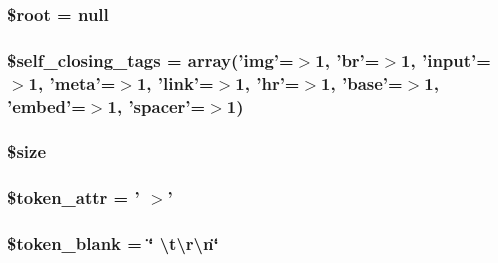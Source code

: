 \hypertarget{classsimple__html__dom_ab37f7c32f41c3c61ed940887453767f4}{
\subsubsection[{\$root}]{\setlength{\rightskip}{0pt plus 5cm}\$root = null}}\label{classsimple__html__dom_ab37f7c32f41c3c61ed940887453767f4}
\hypertarget{classsimple__html__dom_af36f0e679f54f7ee558dd5b96d4b8727}{
\subsubsection[{\$self\+\_\+closing\+\_\+tags}]{\setlength{\rightskip}{0pt plus 5cm}\$self\+\_\+closing\+\_\+tags = array('img'=$>$1, 'br'=$>$1, 'input'=$>$1, 'meta'=$>$1, 'link'=$>$1, 'hr'=$>$1, 'base'=$>$1, 'embed'=$>$1, 'spacer'=$>$1)\hspace{0.3cm}{\ttfamily [protected]}}}\label{classsimple__html__dom_af36f0e679f54f7ee558dd5b96d4b8727}
\hypertarget{classsimple__html__dom_af594986e4618a8d6a5d7566617f583c6}{
\subsubsection[{\$size}]{\setlength{\rightskip}{0pt plus 5cm}\$size}}\label{classsimple__html__dom_af594986e4618a8d6a5d7566617f583c6}
\hypertarget{classsimple__html__dom_a0fb7a78d4e17bb7d156df4f5b79c4d30}{
\subsubsection[{\$token\+\_\+attr}]{\setlength{\rightskip}{0pt plus 5cm}\$token\+\_\+attr = ' $>$'\hspace{0.3cm}{\ttfamily [protected]}}}\label{classsimple__html__dom_a0fb7a78d4e17bb7d156df4f5b79c4d30}
\hypertarget{classsimple__html__dom_ab7f68c12b4913a3685778154760151cd}{
\subsubsection[{\$token\+\_\+blank}]{\setlength{\rightskip}{0pt plus 5cm}\$token\+\_\+blank = \char`\"{} \textbackslash{}t\textbackslash{}r\textbackslash{}n\char`\"{}\hspace{0.3cm}{\ttfamily [protected]}}}\label{classsimple__html__dom_ab7f68c12b4913a3685778154760151cd}
